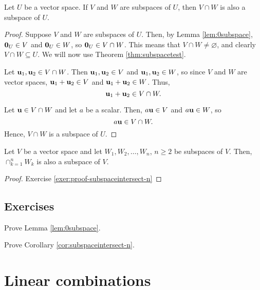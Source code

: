 \begin{thm}\label{thm:subspaceintersect-2}
Let $ U $ be a vector space. If $ V $ and $ W $ are subspaces of $ U $, then $ V\cap W $ is also a subspace of $ U $.
\end{thm}
\begin{proof}
Suppose $ V $ and $ W $ are subspaces of $ U $. Then, by Lemma \ref{lem:0subspace}, $ \mathbf{0}_U\in V $ and $ \mathbf{0}_U\in W $, so $ \mathbf{0}_U\in V\cap W $. This means that $ V\cap W\neq\varnothing $, and clearly $ V\cap W\subseteq U $. We will now use Theorem \ref{thm:subspacetest}.

Let $ \mathbf{u}_1,\mathbf{u}_2\in V\cap W $. Then $ \mathbf{u}_1,\mathbf{u}_2\in V $ and $ \mathbf{u}_1,\mathbf{u}_2\in W $, so since $ V $ and $ W $ are vector spaces, $ \mathbf{u}_1+\mathbf{u}_2\in V $ and $ \mathbf{u}_1+\mathbf{u}_2\in W $. Thus,
\begin{equation*}
    \mathbf{u}_1+\mathbf{u}_2\in V\cap W.
\end{equation*}

Let $ \mathbf{u}\in V\cap W $ and let $ a $ be a scalar. Then, $ a\mathbf{u}\in V $ and $ a\mathbf{u}\in W $, so
\begin{equation*}
    a\mathbf{u}\in V\cap W.
\end{equation*}
Hence, $ V\cap W $ is a subspace of $ U $.
\end{proof}

\begin{cor}\label{cor:subspaceintersect-n}
Let $ V $ be a vector space and let $ W_1,W_2,\ldots,W_n $, $ n\geq 2 $ be subspaces of $ V $. Then, $ \cap_{k=1}^n W_k $ is also a subspace of $ V $.
\end{cor}
\begin{proof}
Exercise \ref{exer:proof-subspaceintersect-n}\noqed
\end{proof}

\subsection*{Exercises}

\begin{exer}\label{exer:proof-0subspace}
Prove Lemma \ref{lem:0subspace}.
\end{exer}

\begin{exer}\label{exer:proof-subspaceintersect-n}
Prove Corollary \ref{cor:subspaceintersect-n}.
\end{exer}

\section{Linear combinations}

